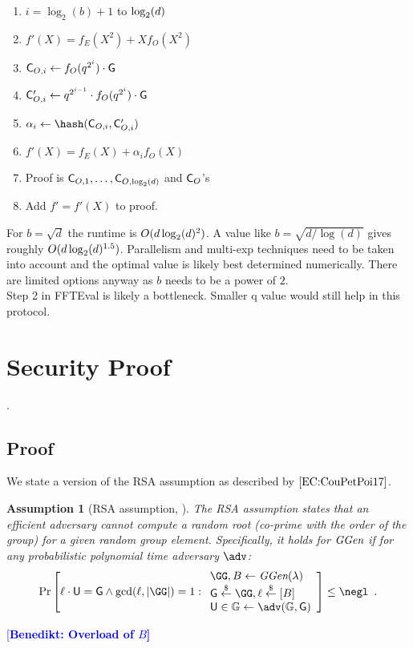 \documentclass[11pt]{article}
\theoremstyle{Definition}
\newtheorem{assumption}{Assumption}
\newcommand{\benedikt}[1]{{\textcolor{blue}{[\bf Benedikt: #1]}}}
\begin{document}
\begin{mdframed}
\begin{enumerate}[nolistsep]
		\item \pcfor $i=\log_2(b)+1$ to $\log_2(d)$
		\item \pcind[1] $f'(X)=f_E(X^2)+Xf_O(X^2)$
		\item \pcind[1] $\mathsf{C}_{O,i}\gets f_O(q^{2^i}) \cdot \mathsf{G}$ 
		\item  \pcind[1] $\mathsf{C}_{O,i}'\gets q^{2^{i-1}} \cdot f_O(q^{2^i}) \cdot \mathsf{G}$ 
		\item \pcind[1] $\alpha_i\gets\hash(\gr{C}_{O,i},\gr{C}_{O,i}')$
		\item \pcind[1] $f'(X)=f_E(X)+\alpha_i f_O(X)$
		\item Proof is $\mathsf{C}_{O,1},\dots,\mathsf{C}_{O,\log_2(d)}$ and $\mathsf{C}_O$'s
		\item Add $f'=f'(X)$ to proof.
	\end{enumerate}
	\end{mdframed}
	For $b=\sqrt{d}$ the runtime is $O(d \log_2(d)^2)$. A value like $b=\sqrt{d/\log(d)}$ gives roughly $O(d\log_2(d)^{1.5})$. Parallelism and multi-exp techniques need to be taken into account and the optimal value is likely best determined numerically. There are limited options anyway as $b$ needs to be a power of $2$.\\ 
Step 2 in FFTEval is likely a bottleneck. Smaller q value would still help in this protocol.
\section{Security Proof}

.

\subsection{Proof}
We state a version of the RSA assumption as described by $\cite{EC:CouPetPoi17}$.
\begin{assumption}[RSA assumption,\cite{RivShaAdl78,EC:CouPetPoi17} ]
	The RSA assumption states that an efficient adversary cannot compute a random root (co-prime with the order of the group) for a given random group element. Specifically, it holds for $\textit{GGen}$ if for any probabilistic polynomial time adversary $\adv$:
	\[
    \Pr\left[\ell \cdot \gr{U} = \Generator \wedge \gcd(\ell,|\GG|)=1:
    \begin{array}{l}
         \GG,B \leftarrow \ggen(\lambda)  \\
         \Generator \sample \GG, \ell \sample [B]  \\
         \gr{U} \in \mathbb{G} \leftarrow \adv(\mathbb{G}, \Generator) \\
    \end{array}\right] \leq \negl \enspace .
\]

\end{assumption}
	\benedikt{Overload of $B$}
\end{document}
